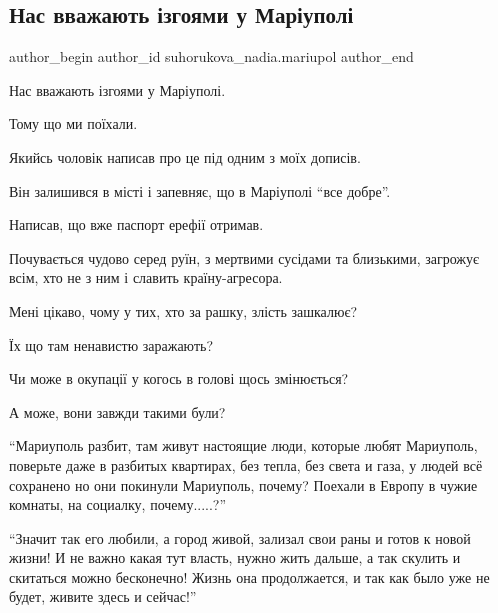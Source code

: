  
 
 
 
 

\subsection{Нас вважають ізгоями у Маріуполі}
\label{sec:12_02_2023.fb.suhorukova_nadia.mariupol.1.nas_vvazhayut__zgoya}

\ifcmt
 author_begin
   author_id suhorukova_nadia.mariupol
 author_end
\fi

Нас вважають ізгоями у Маріуполі.

Тому що ми поїхали.

Якийсь чоловік написав про це під одним з моїх дописів.

Він залишився в місті і запевняє, що в Маріуполі \enquote{все добре}.

Написав, що вже паспорт ерефії отримав.

Почувається чудово серед руїн, з мертвими сусідами та близькими, загрожує всім,
хто не з ним і славить країну-агресора.

Мені цікаво, чому у тих, хто за рашку, злість зашкалює?

Їх що там ненавистю заражають?

Чи може в окупації у когось  в голові щось змінюється?

А може, вони завжди такими були?

\enquote{Мариуполь разбит, там живут настоящие люди, которые любят Мариуполь, поверьте
даже в разбитых квартирах, без тепла, без света и газа, у людей всё сохранено
но они покинули Мариуполь, почему? Поехали в Европу в чужие комнаты, на
социалку, почему.....?}

\enquote{Значит так его любили, а город живой, зализал  свои раны и готов к новой жизни! И
не важно какая тут власть, нужно жить дальше, а так скулить и скитаться можно
бесконечно! Жизнь она продолжается, и так как было уже не будет, живите здесь и
сейчас!}

